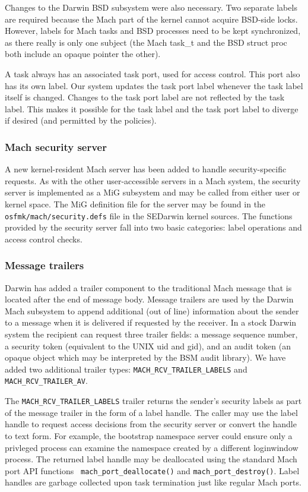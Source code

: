 Changes to the Darwin BSD subsystem were also necessary.  Two separate
labels are required because the Mach part of the kernel cannot acquire
BSD-side locks.  However, labels for Mach tasks and BSD processes need
to be kept synchronized, as there really is only one subject (the Mach
task\_t and the BSD struct proc both include an opaque pointer the
other).

A task always has an associated task port, used for access control.
This port also has its own label.  Our system updates the task port
label whenever the task label itself is changed.  Changes to the
task port label are not reflected by the task label.  This makes it
possible for the task label and the task port label to diverge if
desired (and permitted by the policies).

\subsubsection{Mach security server}

A new kernel-resident Mach server has been added to handle security-specific
requests.  As with the other user-accessible servers in a Mach
system, the security server is implemented as a MiG subsystem and
may be called from either user or kernel space.  The MiG definition
file for the server may be found in the {\tt osfmk/mach/security.defs}
file in the SEDarwin kernel sources.  The functions provided by the
security server fall into two basic categories: label operations
and access control checks.

\subsubsection{Message trailers}

Darwin has added a trailer component to the traditional Mach message
that is located after the end of message body.  Message trailers
are used by the Darwin Mach subsystem to append additional (out of
line) information about the sender to a message when it is delivered
if requested by the receiver.  In a stock Darwin system the recipient
can request three trailer fields: a message sequence number, a
security token (equivalent to the UNIX uid and gid), and an audit
token (an opaque object which may be interpreted by the BSM audit
library).  We have added two additional trailer types:
{\tt MACH\_RCV\_TRAILER\_LABELS} and {\tt MACH\_RCV\_TRAILER\_AV}.

The {\tt MACH\_RCV\_TRAILER\_LABELS} trailer returns the sender's
security labels as part of the message trailer in the form of a
label handle.  The caller may use the label handle to request access
decisions from the security server or convert the handle to text
form.  For example, the bootstrap namespace server could ensure
only a privleged process can examine the namespace created by a
different loginwindow process.  The returned label handle may be
deallocated using the standard Mach port API functions {\tt
mach\_port\_deallocate()} and {\tt mach\_port\_destroy()}.  Label
handles are garbage collected upon task termination just like regular
Mach ports.

